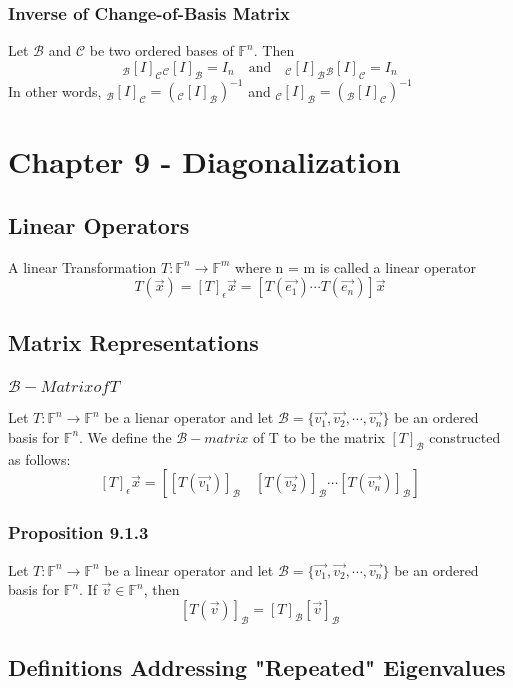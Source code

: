\documentclass[12pt, letterpaper]{article}
\begin{document}
\subsubsection{Inverse of Change-of-Basis Matrix}
Let $\mathcal{B}$ and $\mathcal{C}$ be two ordered bases of $\mathbb{F}^n$. Then 
\[_\mathcal{B}[I]_\mathcal{C} {_\mathcal{C}[I]_\mathcal{B}} = I_n \quad\text{and}\quad _\mathcal{C}[I]_\mathcal{B} {_\mathcal{B}[I]_\mathcal{C}} = I_n\]
In other words, $_\mathcal{B}[I]_\mathcal{C} = (_\mathcal{C}[I]_\mathcal{B})^{-1}$ and $_\mathcal{C}[I]_\mathcal{B} = (_\mathcal{B}[I]_\mathcal{C})^{-1}$

\section{Chapter 9 - Diagonalization}
\subsection{Linear Operators}
A linear Transformation $T:\mathbb{F}^n\rightarrow\mathbb{F}^m$ where n = m is called a linear operator 
\[T(\vec{x}) = [T]_\epsilon\vec{x} = [T(\vec{e_1})\cdots T(\vec{e_n})]\vec{x}\]
\subsection{Matrix Representations}
\subsubsection{$\mathcal{B}-Matrix of T$}
Let $T:\mathbb{F}^n\rightarrow\mathbb{F}^n$ be a lienar operator and let $\mathcal{B} = \{\vec{v_1}, \vec{v_2},\cdots, \vec{v_n}\}$
be an ordered basis for $\mathbb{F}^n$. We define the $\mathcal{B}-matrix$ of T to be the matrix $[T]_\mathcal{B}$ constructed as follows:
\[[T]_\epsilon\vec{x} = [[T(\vec{v_1})]_\mathcal{B}\quad [T(\vec{v_2})]_\mathcal{B}\cdots[T(\vec{v_n})]_\mathcal{B}]\]
\subsubsection{Proposition 9.1.3}
Let $T:\mathbb{F}^n\rightarrow\mathbb{F}^n$ be a linear operator and let $\mathcal{B} = \{\vec{v_1}, \vec{v_2},\cdots,\vec{v_n}\}$ be an ordered basis for 
$\mathbb{F}^n$. If $\vec{v}\in\mathbb{F}^n$, then 
\[[T(\vec{v})]_\mathcal{B} = [T]_\mathcal{B}[\vec{v}]_\mathcal{B}\]
\subsection{Definitions Addressing "Repeated" Eigenvalues}
\end{document}
